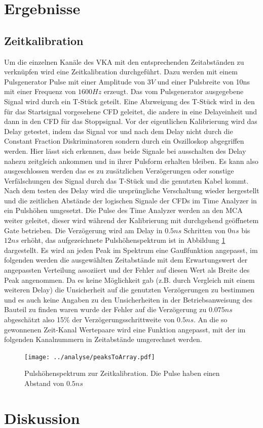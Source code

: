 \documentclass[a4paper,12pt]{article}
\begin{document}
\section{Ergebnisse}
	\subsection{Zeitkalibration}
		Um die einzelnen Kanäle des VKA mit den entsprechenden Zeitabständen zu verknüpfen wird eine Zeitkalibration durchgeführt. Dazu werden
		mit einem Pulsgenerator Pulse mit einer Amplitude von $3\si{V}$ und einer Pulsbreite von 10ns mit einer Frequenz von $1600\si{Hz}$ erzeugt.
		Das vom Pulsgenerator ausgegebene Signal wird durch ein T-Stück geteilt. Eine Abzweigung des T-Stück wird in den für das Startsignal vorgesehene 
		CFD geleitet, die andere in eine Delayeinheit und dann in den CFD für das Stoppsignal. Vor der eigentlichen Kalibrierung wird das Delay getestet, indem
		das Signal vor und nach dem Delay nicht durch die Constant Fraction Diskriminatoren sondern durch ein Oszilloskop abgegriffen werden. Hier lässt sich erkennen,
		dass beide Signale bei ausschalten des Delay nahezu zeitgleich ankommen und in ihrer Pulsform erhalten bleiben. Es kann also ausgeschlossen werden das es zu 
		zusätzlichen Verzögerungen oder sonstige Verfälschungen des Signal durch das T-Stück und die genutzten Kabel kommt.
		Nach dem testen des Delay wird die ursprüngliche Verschaltung wieder hergestellt und die zeitlichen Abstände der logischen Signale der CFDs im Time Analyzer
		in ein Pulshöhen umgesetzt. Die Pulse des Time Analyzer werden an den MCA weiter geleitet, dieser wird während der Kalibrierung mit
		durchgehend geöffnetem Gate betrieben. Die Verzögerung wird am Delay in $0.5\si{ns}$ Schritten von $0\si{ns}$ bis $12\si{ns}$ erhöht, das aufgezeichnete Pulshöhenspektrum 
		ist in Abbildung \ref{fig:timepuls} dargestellt. Es wird an jeden Peak im Spektrum eine Gaußfunktion angepasst, im folgenden werden die ausgewählten Zeitabstände mit
		dem Erwartungswert \mu der angepassten Verteilung assoziiert und der Fehler auf diesen Wert als Breite des Peak \sigma angenommen. Da es keine Möglichkeit gab 
		(z.B. durch Vergleich mit einem weiteren Delay) die Unsicherheit auf die genutzten Verzögerungen zu bestimmen und es auch keine Angaben zu
		den Unsicherheiten in der Betriebsanweisung des Bauteil zu finden waren wurde der Fehler auf die Verzögerung zu $0.075\si{ns}$ abgeschätzt also 
		15\% der Verzögerungsschrittweite von $0.5\si{ns}$. An die so gewonnenen Zeit-Kanal Wertepaare wird eine Funktion angepasst, mit der im folgenden 
		Kanalnummern in Zeitabstände umgerechnet werden. 
		
		\begin{figure}
		\texttt{[image: ../analyse/peaksToArray.pdf]}
		\caption{Pulshöhenspektrum zur Zeitkalibration. Die Pulse haben einen Abstand von $0.5\si{ns}$}
		\label{fig:timepuls}
		\end{figure} 
\section{Diskussion} 
\end{document}
